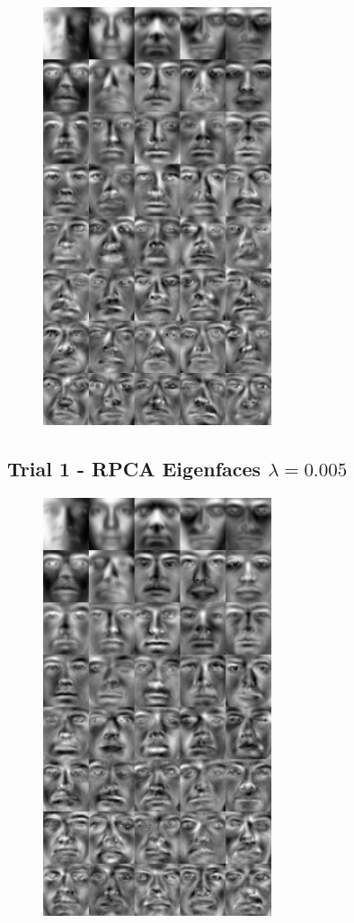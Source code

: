 \documentclass[11pt]{scrartcl} %
\theoremstyle{plain}
\begin{document}
\begin{figure}[H]
\centering
\includegraphics[width=0.6\textwidth]{figures/trial1eigenfaces.jpg}
\end{figure}

\subsection{Trial 1 - RPCA Eigenfaces $\lambda = 0.005$}

\begin{figure}[H]
\centering
\includegraphics[width=0.6\textwidth]{figures/trial1rpca0dot005eigenfaces.jpg}
\end{figure}
\end{document}
